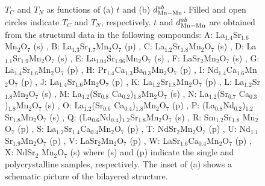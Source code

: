 \begin{figure}
\columnwidth
\centerline{}
%
\caption{
$T_C$ and $T_N$ as functions of (a) $t$ 
and (b) $d_{\rm Mn-Mn}^{ab}$. 
Filled and open circles indicate $T_C$ and $T_N$, respectively. 
$t$ and $d_{\rm Mn-Mn}^{ab}$ are obtained from the structural data in 
the following compounds: 
%
A: La$_{1.4}$Sr$_{1.6}$Mn$_2$O$_7$                    (s)    \protect\cite{kubota}, 
B: La$_{1.3}$Sr$_{1.7}$Mn$_2$O$_7$                    (p)    \protect\cite{kubota},
C: La$_{1.2}$Sr$_{1.8}$Mn$_2$O$_7$                    (s)    \protect\cite{kubota},
D: La$_{1.1}$Sr$_{1.9}$Mn$_2$O$_7$                    (s)    \protect\cite{kubota},
E: La$_{1.04}$Sr$_{1.96}$Mn$_2$O$_7$                  (s)    \protect\cite{kubota},
F: LaSr$_2$Mn$_2$O$_7$                                (s)    \protect\cite{kubota}, 
G: La$_{1.4}$Sr$_{1.6}$Mn$_2$O$_7$                    (p)    \protect\cite{argyriou99}, 
H: Pr$_{1.4}$Ca$_{1.3}$Ba$_{0.3}$Mn$_2$O$_7$          (p)    \protect\cite{laffez}, 
I: Nd$_{1.4}$Ca$_{1.6}$Mn$_2$O$_7$                    (p)    \protect\cite{laffez}, 
J: La$_{1.4}$Sr$_{1.6}$Mn$_2$O$_7$                    (p)    \protect\cite{chi}, 
K: La$_{1.2}$Sr$_{1.8}$Mn$_2$O$_7$                       (p) \protect\cite{argyriou97}, 
L: La$_{1.2}$Sr$_{1.8}$Mn$_2$O$_7$                       (s) \protect\cite{akimoto}, 
M: La$_{1.2}$(Sr$_{0.8}$ Ca$_{0.2}$)$_{1.8}$Mn$_2$O$_7$   (s) \protect\cite{akimoto}, 
N: La$_{1.2}$(Sr$_{0.7}$ Ca$_{0.3}$)$_{1.8}$Mn$_2$O$_7$   (s) \protect\cite{akimoto}, 
O: La$_{1.2}$(Sr$_{0.6}$ Ca$_{0.4}$)$_{1.8}$Mn$_2$O$_7$   (p) \protect\cite{akimoto}, 
P: (La$_{0.8}$Nd$_{0.2}$)$_{1.2}$Sr$_{1.8}$Mn$_2$O$_7$   (s) \protect\cite{akimoto}, 
Q: (La$_{0.6}$Nd$_{0.4}$)$_{1.2}$Sr$_{1.8}$Mn$_2$O$_7$   (s) \protect\cite{akimoto}, 
R: Sm$_{1.2}$Sr$_{1.8}$ Mn$_2$O$_7$                      (p) \protect\cite{battle98}, 
S: La$_{1.2}$Sr$_{1.4}$Ca$_{0.4}$Mn$_2$O$_7$             (p) \protect\cite{shen}, 
T: NdSr$_2$Mn$_2$O$_7$                                   (p) \protect\cite{battle96}, 
U: Nd$_{1.1}$Sr$_{1.9}$Mn$_2$O$_7$                       (p) \protect\cite{battle96}, 
V: LaSr$_2$Mn$_2$O$_7$                                   (p) \protect\cite{seshadri}, 
W: LaSr$_{1.6}$Ca$_{0.4}$Mn$_2$O$_7$                     (p) \protect\cite{akimoto2}, 
X: NdSr$_2$ Mn$_2$O$_7$                                  (s) \protect\cite{akimoto2} 
%
%
where (s) and (p) indicate the single and polycrystalline samples, 
respectively. 
The inset of (a) shows a schematic picture of the bilayered structure.}
%
\label{fig:fig1}
\end{figure}
